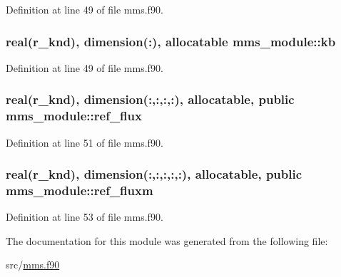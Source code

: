 Definition at line 49 of file mms.\-f90.

\hypertarget{classmms__module_a634bb1d1d1405007f6bec01e8b6d9b85}{
\subsubsection[{kb}]{\setlength{\rightskip}{0pt plus 5cm}real(r\-\_\-knd), dimension(\-:), allocatable mms\-\_\-module\-::kb\hspace{0.3cm}{\ttfamily [private]}}}\label{classmms__module_a634bb1d1d1405007f6bec01e8b6d9b85}


Definition at line 49 of file mms.\-f90.

\hypertarget{classmms__module_a20157f9a49b1c0b449c340b7b1a63791}{
\subsubsection[{ref\-\_\-flux}]{\setlength{\rightskip}{0pt plus 5cm}real(r\-\_\-knd), dimension(\-:,\-:,\-:,\-:), allocatable, public mms\-\_\-module\-::ref\-\_\-flux}}\label{classmms__module_a20157f9a49b1c0b449c340b7b1a63791}


Definition at line 51 of file mms.\-f90.

\hypertarget{classmms__module_aaa592b5b9f1591e2a34df390563b0c56}{
\subsubsection[{ref\-\_\-fluxm}]{\setlength{\rightskip}{0pt plus 5cm}real(r\-\_\-knd), dimension(\-:,\-:,\-:,\-:,\-:), allocatable, public mms\-\_\-module\-::ref\-\_\-fluxm}}\label{classmms__module_aaa592b5b9f1591e2a34df390563b0c56}


Definition at line 53 of file mms.\-f90.



The documentation for this module was generated from the following file\-:\begin{DoxyCompactItemize}
\item 
src/\hyperlink{mms_8f90}{mms.\-f90}\end{DoxyCompactItemize}
